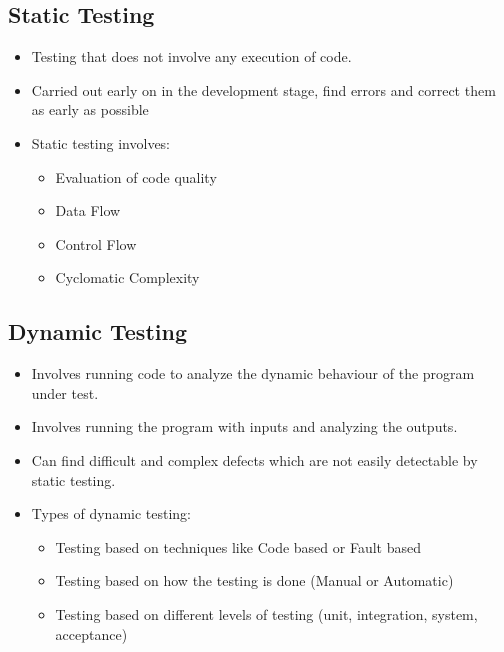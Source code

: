 \documentclass{article}
\begin{document}
\subsection{Static Testing}
\begin{itemize}
    \item Testing that does not involve any execution of code. 
    
    \item Carried out early on in the development stage, find errors and correct them as early as possible
    
    \item Static testing involves:
    \begin{itemize}
        \item Evaluation of code quality
        \item Data Flow
        \item Control Flow
        \item Cyclomatic Complexity
    \end{itemize}
\end{itemize}

\subsection{Dynamic Testing}
\begin{itemize}
    \item Involves running code to analyze the dynamic behaviour of the program under test. 
    
    \item Involves running the program with inputs and analyzing the outputs.
    
    \item Can find difficult and complex defects which are not easily detectable by static testing. 
    
    \item Types of dynamic testing:
    \begin{itemize}
        \item Testing based on techniques like Code based or Fault based
        
        \item Testing based on how the testing is done (Manual or Automatic)
        
        \item Testing based on different levels of testing (unit, integration, system, acceptance)
    \end{itemize}
\end{itemize}
\end{document}
